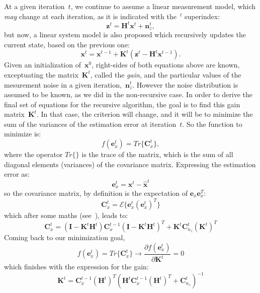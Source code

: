 At a given iteration~$t$, we continue to assume a linear measurement model, which \textit{may} change at each iteration, as it is indicated with the~${}^t$ superindex: 
\begin{equation}
 \mathbf{z}^t = \mathbf{H}^t\mathbf{x}^t + \mathbf{n}^t_z,
\end{equation}
but now, a linear system model is also proposed which recursively updates the current state, based on the previous one: 
\begin{equation}
 \mathbf{x}^t = \mathbf{x}^{t-1} + \mathbf{K}^t(\mathbf{z}^t - \mathbf{H}^t\mathbf{x}^{t-1}).
\end{equation}
Given an initialization of~$\mathbf{x}^0$, right-sides of both equations above are known, exceptuating the matrix~$\mathbf{K}^t$, called the \textit{gain}, and the particular values of the mesurement noise in a given iteration,~$\mathbf{n}^t_z$. However the noise distribution is assumed to be known, as we did in the non-recursive case. In order to derive the final set of equations for the recursive algorithm, the goal is to find this gain matrix~$\mathbf{K}^t$. In that case, the criterion will change, and it will be to minimize the sum of the variances of the estimation error at iteration~$t$. So the function to minimize is:
\begin{equation}
 f(\mathbf{e}^t_x) = Tr\{\mathbf{C}^t_{x}\},
\end{equation}
where the operator $Tr\{\}$ is the trace of the matrix, which is the sum of all diagonal elements (variances) of the covariance matrix. Expressing the estimation error as: 
\begin{equation}
 \mathbf{e}^t_x = \mathbf{x}^t - \hat{\mathbf{x}}^t
\end{equation}
so the covariance matrix, by definition is the expectation of $\mathbf{e}_x\mathbf{e}^T_x$:
\begin{equation}
 \mathbf{C}^t_{x} = \mathcal{E}\{\mathbf{e}^t_x(\mathbf{e}^t_x)^T\}
\end{equation}
which after some maths (see~\cite{simon06}), leads to: 
\begin{equation}
 \mathbf{C}^t_{x} = (\mathbf{I}-\mathbf{K}^t\mathbf{H}^t)\mathbf{C}^{t-1}_x(\mathbf{I}-\mathbf{K}^t\mathbf{H}^t)^T
		    + \mathbf{K}^t\mathbf{C}^t_{n_z}(\mathbf{K}^t)^T
\end{equation}
Coming back to our minimization goal, 
\begin{equation}
 f(\mathbf{e}^t_x) = Tr\{\mathbf{C}^t_{x}\} \rightarrow \frac{\partial f(\mathbf{e}^t_x)}{\partial \mathbf{K}^t} = 0
\end{equation}
which finishes with the expression for the gain:
\begin{equation}
 \mathbf{K}^t = \mathbf{C}^{t-1}_x(\mathbf{H}^t)^T(\mathbf{H}^t\mathbf{C}^{t-1}_x(\mathbf{H}^t)^T+\mathbf{C}^t_{n_z})^{-1}
\end{equation}

